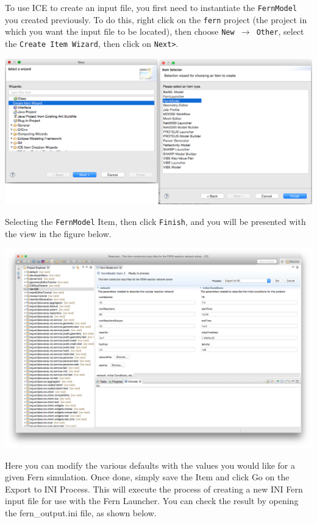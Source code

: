 To use ICE to create an input file, you first need to instantiate the
\texttt{FernModel} you created previously. To do this, right click on the
\texttt{fern} project (the project in which you want the input file to be
located), then choose \texttt{New $\rightarrow$ Other},  select the
\texttt{Create Item Wizard}, then click on \texttt{Next>}.
\begin{center} \includegraphics[width=\textwidth]{figures/creatingFernModelItem}
\end{center}
Selecting the \texttt{FernModel} Item, then click \texttt{Finish}, and you will
be presented with the view in the figure below. 
\begin{center} \includegraphics[width=\textwidth]{figures/fernmodelItem}
\end{center}
Here you can modify the various defaults with the values you would like for a
given Fern simulation. Once done, simply save the Item and click Go on the
Export to INI Process. This will execute the process of creating a new INI Fern
input file for use with the Fern Launcher. You can check the result by opening
the fern\_output.ini file, as shown below. 

